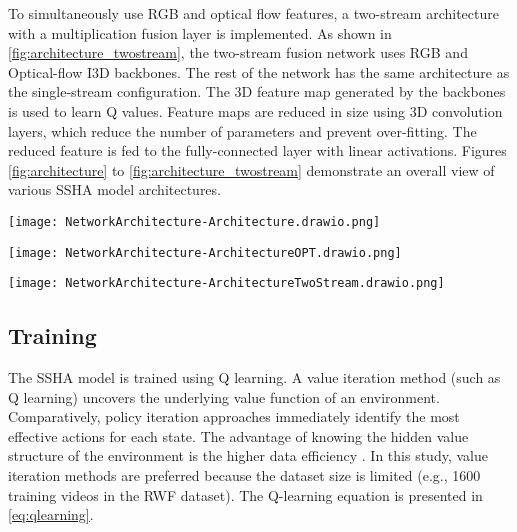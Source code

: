 \documentclass[review]{elsarticle}
\begin{document}
To simultaneously use RGB and optical flow features, a two-stream architecture \citep{feichtenhofer2016convolutional} with a multiplication fusion layer is implemented. As shown in \autoref{fig:architecture_twostream}, the two-stream fusion network uses RGB and Optical-flow I3D backbones. The rest of the network has the same architecture as the single-stream configuration. The 3D feature map generated by the backbones is used to learn Q values. Feature maps are reduced in size using 3D convolution layers, which reduce the number of parameters and prevent over-fitting. The reduced feature is fed to the fully-connected layer with linear activations. Figures \ref{fig:architecture} to \ref{fig:architecture_twostream} demonstrate an overall view of various SSHA model architectures.


\begin{figure*}[!htbp]
    \centering
    \texttt{[image: NetworkArchitecture-Architecture.drawio.png]}
    \caption{SSHA model architecture (RBG only).}
    \label{fig:architecture}
\end{figure*}

\begin{figure*}[!htbp]
    \centering
    \texttt{[image: NetworkArchitecture-ArchitectureOPT.drawio.png]}
    \caption{SSHA model architecture (Optical-flow only).}
    \label{fig:architecture_opt}
\end{figure*}

\begin{figure*}[!htbp]
    \centering
    \texttt{[image: NetworkArchitecture-ArchitectureTwoStream.drawio.png]}
    \caption{SSHA model architecture (Two-stream fusion).}
    \label{fig:architecture_twostream}
\end{figure*}


\subsection{Training}

The SSHA model is trained using Q learning. A value iteration method (such as Q learning) uncovers the underlying value function of an environment. Comparatively, policy iteration approaches immediately identify the most effective actions for each state. The advantage of knowing the hidden value structure of the environment is the higher data efficiency {\citep{hamadouche2021comparison}}. In this study, value iteration methods are preferred because the dataset size is limited (e.g., 1600 training videos in the RWF dataset). The Q-learning equation is presented in {\autoref{eq:qlearning}}.
\end{document}
